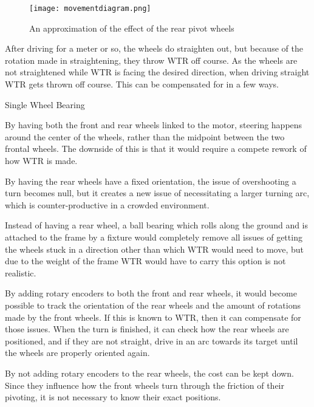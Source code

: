 \begin{figure}[H]

\texttt{[image: movementdiagram.png]}
\caption{An approximation of the effect of the rear pivot wheels}
\label{fig::mvmnt}
\end{figure}
After driving for a meter or so, the wheels do straighten out, but because of the rotation made in straightening, they throw WTR off course.
As the wheels are not straightened while WTR is facing the desired direction, when driving straight WTR gets thrown off course.
This can be compensated for in a few ways.

\begin{labeling}{Single Wheel Bearing}
\item [Tank Controls] By having both the front and rear wheels linked to the motor, steering happens around the center of the wheels, rather than the midpoint between the two frontal wheels. The downside of this is that it would require a compete rework of how WTR is made.
\item [Fixed Rear Wheels] By having the rear wheels have a fixed orientation, the issue of overshooting a turn becomes null, but it creates a new issue of necessitating a larger turning arc, which is counter-productive in a crowded environment.
\item [Single Wheel Bearing] Instead of having a rear wheel, a ball bearing which rolls along the ground and is attached to the frame by a fixture would completely remove all issues of getting the wheels stuck in a direction other than which WTR would need to move, but due to the weight of the frame WTR would have to carry this option is not realistic.
\item [Rotary Encoders] By adding rotary encoders to both the front and rear wheels, it would become possible to track the orientation of the rear wheels and the amount of rotations made by the front wheels. If this is known to WTR, then it can compensate for those issues. When the turn is finished, it can check how the rear wheels are positioned, and if they are not straight, drive in an arc towards its target until the wheels are properly oriented again. 
\item [Front wheel encoders] By not adding rotary encoders to the rear wheels, the cost can be kept down. Since they influence how the front wheels turn through the friction of their pivoting, it is not necessary to know their exact positions.
\end{labeling}

\newpage